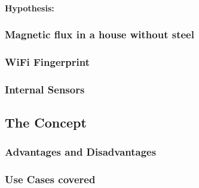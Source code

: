 \paragraph{Hypothesis: }

\subsubsection{Magnetic flux in a house without steel}

\subsubsection{WiFi Fingerprint}

\subsubsection{Internal Sensors}

\subsection{The Concept} 

\subsubsection{Advantages and Disadvantages}

\subsubsection{Use Cases covered}

